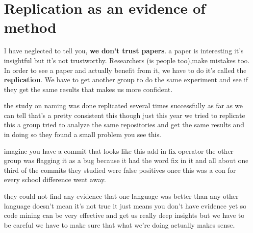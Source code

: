 \documentclass[14pt]{extreport}
\begin{document}
\chapter{Replication as an evidence of method} %
I have neglected to tell you, \textbf{we don't trust papers}. 
a paper is interesting it's insightful but it's not trustworthy. 
Researchers (is people too),make mistakes too.
In order to see a paper and actually benefit from it, we have to do it's called the \textbf{replication}. 
We have to get another group to do the same experiment and see if they get the same results that makes us more confident. \par
the study on naming was done replicated several times successfully as far as we can tell that's a pretty consistent this though just this year we tried to replicate this a group tried to analyze the same repositories and get the same results and in doing so they found a small problem you see this. 
\par
imagine you have a commit that looks like this add in fix operator the other group was flagging it as a bug because it had the word fix in it and all about one third of the commits they studied were false positives once this was a con for every school difference went away. 
\par
they could not find any evidence that one language was better than any other language doesn't mean it's not true it just means you don't have evidence yet so code mining can be very effective and get us really deep insights but we have to be careful we have to make sure that what we're doing actually makes sense. 
\end{document}
